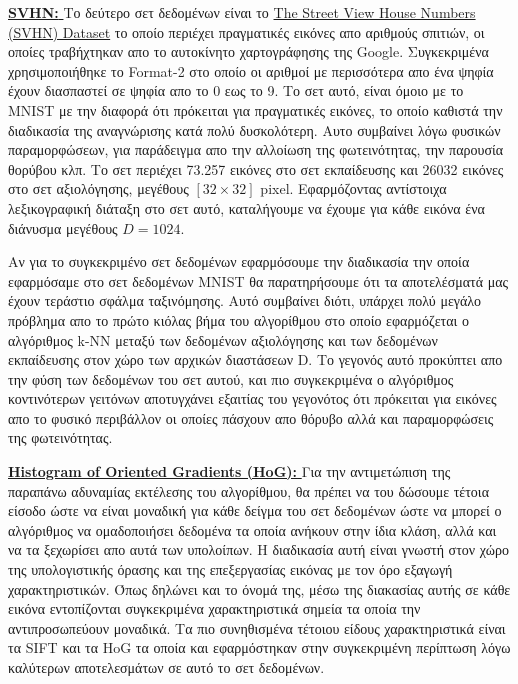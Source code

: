\par
\href{http://ufldl.stanford.edu/housenumbers/}{\textbf{\textlatin{SVHN: }}}Το δεύτερο σετ δεδομένων είναι το \href{http://ufldl.stanford.edu/housenumbers/}{\textlatin{The Street View House Numbers (SVHN) Dataset}}\cite{12} το οποίο περιέχει πραγματικές εικόνες απο αριθμούς σπιτιών, οι οποίες τραβήχτηκαν απο το αυτοκίνητο χαρτογράφησης της \textlatin{Google}. Συγκεκριμένα χρησιμοποιήθηκε το \textlatin{Format-2} στο οποίο οι αριθμοί με περισσότερα απο ένα ψηφία έχουν διασπαστεί σε ψηφία απο το 0 εως το 9. Το σετ αυτό, είναι όμοιο με το \textlatin{MNIST} με την διαφορά ότι πρόκειται για πραγματικές εικόνες, το οποίο καθιστά την διαδικασία της αναγνώρισης κατά πολύ δυσκολότερη. Αυτο συμβαίνει λόγω φυσικών παραμορφώσεων, για παράδειγμα απο την αλλοίωση της φωτεινότητας, την παρουσία θορύβου κλπ. Το σετ περιέχει 73.257 εικόνες στο σετ εκπαίδευσης και 26032 εικόνες στο σετ αξιολόγησης, μεγέθους $[32 \times 32]$ \textlatin{pixel}. Εφαρμόζοντας αντίστοιχα λεξικογραφική διάταξη στο σετ αυτό, καταλήγουμε να έχουμε για κάθε εικόνα ένα διάνυσμα μεγέθους $D = 1024$. 
\par
Αν για το συγκεκριμένο σετ δεδομένων εφαρμόσουμε την διαδικασία την οποία εφαρμόσαμε στο σετ δεδομένων \textlatin{MNIST} θα παρατηρήσουμε ότι τα αποτελέσματά μας έχουν τεράστιο σφάλμα ταξινόμησης. Αυτό συμβαίνει διότι, υπάρχει πολύ μεγάλο πρόβλημα απο το πρώτο κιόλας βήμα του αλγορίθμου στο οποίο εφαρμόζεται ο αλγόριθμος \textlatin{k-NN} μεταξύ των δεδομένων αξιολόγησης και των δεδομένων εκπαίδευσης στον χώρο των αρχικών διαστάσεων \textlatin{D}. Το γεγονός αυτό προκύπτει απο την φύση των δεδομένων του σετ αυτού, και πιο συγκεκριμένα ο αλγόριθμος κοντινότερων γειτόνων αποτυγχάνει εξαιτίας του γεγονότος ότι πρόκειται για εικόνες απο το φυσικό περιβάλλον οι οποίες πάσχουν απο θόρυβο αλλά και παραμορφώσεις της φωτεινότητας. 
\par
\href{https://en.wikipedia.org/wiki/Histogram_of_oriented_gradients}{\textbf{\textlatin{Histogram of Oriented Gradients (HoG): }}} Για την αντιμετώπιση της παραπάνω αδυναμίας εκτέλεσης του αλγορίθμου, θα πρέπει να του δώσουμε τέτοια είσοδο ώστε να είναι μοναδική για κάθε δείγμα του σετ δεδομένων ώστε να μπορεί ο αλγόριθμος να ομαδοποιήσει δεδομένα τα οποία ανήκουν στην ίδια κλάση, αλλά και να τα ξεχωρίσει απο αυτά των υπολοίπων. Η διαδικασία αυτή είναι γνωστή στον χώρο της υπολογιστικής όρασης και της επεξεργασίας εικόνας με τον όρο εξαγωγή χαρακτηριστικών. Όπως δηλώνει και το όνομά της, μέσω της διακασίας αυτής σε κάθε εικόνα εντοπίζονται συγκεκριμένα χαρακτηριστικά σημεία τα οποία την αντιπροσωπεύουν μοναδικά. Τα πιο συνηθισμένα τέτοιου είδους χαρακτηριστικά είναι τα \textlatin{SIFT} και τα \textlatin{HoG} τα οποία και εφαρμόστηκαν στην συγκεκριμένη περίπτωση λόγω καλύτερων αποτελεσμάτων σε αυτό το σετ δεδομένων. 
